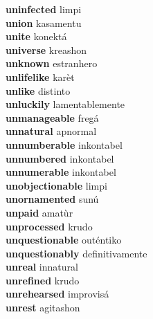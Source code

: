 \textbf{uninfected } limpi \\
\textbf{union } kasamentu \\
\textbf{unite } konektá \\
\textbf{universe } kreashon \\
\textbf{unknown } estranhero \\
\textbf{unlifelike } karèt \\
\textbf{unlike } distinto \\
\textbf{unluckily } lamentablemente \\
\textbf{unmanageable } fregá \\
\textbf{unnatural } apnormal \\
\textbf{unnumberable } inkontabel \\
\textbf{unnumbered } inkontabel \\
\textbf{unnumerable } inkontabel \\
\textbf{unobjectionable } limpi \\
\textbf{unornamented } sunú \\
\textbf{unpaid } amatùr \\
\textbf{unprocessed } krudo \\
\textbf{unquestionable } outéntiko \\
\textbf{unquestionably } definitivamente \\
\textbf{unreal } innatural \\
\textbf{unrefined } krudo \\
\textbf{unrehearsed } improvisá \\
\textbf{unrest } agitashon \\
